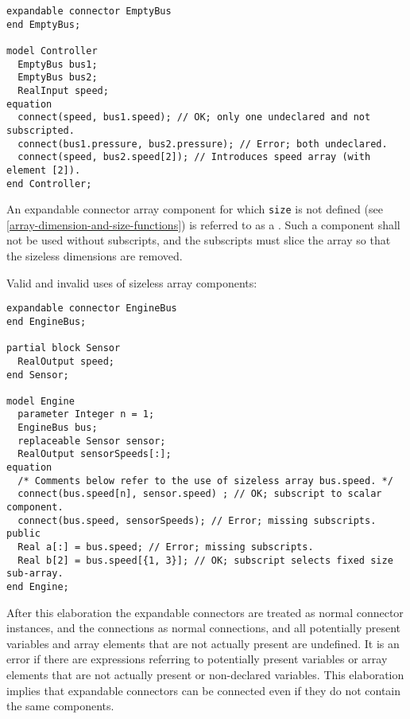 \begin{example}
\begin{lstlisting}[language=modelica]
expandable connector EmptyBus
end EmptyBus;

model Controller
  EmptyBus bus1;
  EmptyBus bus2;
  RealInput speed;
equation
  connect(speed, bus1.speed); // OK; only one undeclared and not subscripted.
  connect(bus1.pressure, bus2.pressure); // Error; both undeclared.
  connect(speed, bus2.speed[2]); // Introduces speed array (with element [2]).
end Controller;
\end{lstlisting}
\end{example}

An expandable connector array component for which \lstinline!size! is not defined (see \cref{array-dimension-and-size-functions}) is referred to as a .
Such a component shall not be used without subscripts, and the subscripts must slice the array so that the sizeless dimensions are removed.

\begin{example}
Valid and invalid uses of sizeless array components:
\begin{lstlisting}[language=modelica]
expandable connector EngineBus
end EngineBus;

partial block Sensor
  RealOutput speed;
end Sensor;

model Engine
  parameter Integer n = 1;
  EngineBus bus;
  replaceable Sensor sensor;
  RealOutput sensorSpeeds[:];
equation
  /* Comments below refer to the use of sizeless array bus.speed. */
  connect(bus.speed[n], sensor.speed) ; // OK; subscript to scalar component.
  connect(bus.speed, sensorSpeeds); // Error; missing subscripts.
public
  Real a[:] = bus.speed; // Error; missing subscripts.
  Real b[2] = bus.speed[{1, 3}]; // OK; subscript selects fixed size sub-array.
end Engine;
\end{lstlisting}
\end{example}

After this elaboration the expandable connectors are treated as normal connector instances, and the connections as normal connections, and all potentially present variables and array elements that are not actually present are undefined.
It is an error if there are expressions referring to potentially present variables or array elements that are not actually present or non-declared variables.
This elaboration implies that expandable connectors can be connected even if they do not contain the same components.


